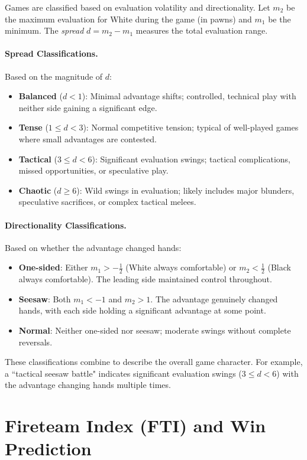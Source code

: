 \documentclass[11pt]{book}
\begin{document}
Games are classified based on evaluation volatility and directionality. Let $m_2$ be the maximum evaluation for White during the game (in pawns) and $m_1$ be the minimum. The \emph{spread} $d = m_2 - m_1$ measures the total evaluation range.

\paragraph{Spread Classifications.} Based on the magnitude of $d$:
\begin{itemize}
\item \textbf{Balanced} ($d < 1$): Minimal advantage shifts; controlled, technical play with neither side gaining a significant edge.
\item \textbf{Tense} ($1 \le d < 3$): Normal competitive tension; typical of well-played games where small advantages are contested.
\item \textbf{Tactical} ($3 \le d < 6$): Significant evaluation swings; tactical complications, missed opportunities, or speculative play.
\item \textbf{Chaotic} ($d \ge 6$): Wild swings in evaluation; likely includes major blunders, speculative sacrifices, or complex tactical melees.
\end{itemize}

\paragraph{Directionality Classifications.} Based on whether the advantage changed hands:
\begin{itemize}
\item \textbf{One-sided}: Either $m_1 > -\frac{1}{2}$ (White always comfortable) or $m_2 < \frac{1}{2}$ (Black always comfortable). The leading side maintained control throughout.
\item \textbf{Seesaw}: Both $m_1 < -1$ and $m_2 > 1$. The advantage genuinely changed hands, with each side holding a significant advantage at some point.
\item \textbf{Normal}: Neither one-sided nor seesaw; moderate swings without complete reversals.
\end{itemize}

These classifications combine to describe the overall game character. For example, a ``tactical seesaw battle" indicates significant evaluation swings ($3 \le d < 6$) with the advantage changing hands multiple times.

\section{Fireteam Index (FTI) and Win Prediction}
\end{document}

